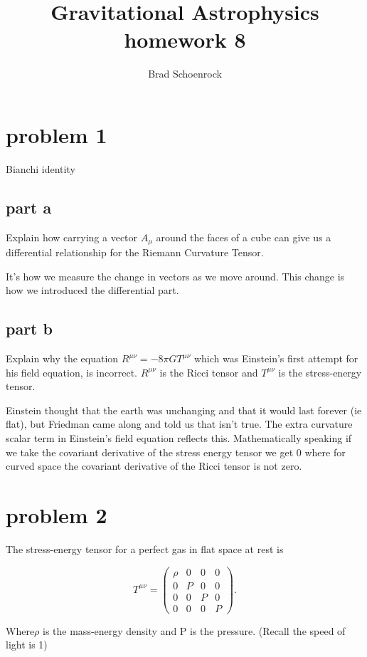 \documentclass{article}
\title{Gravitational Astrophysics homework 8}
\author{Brad Schoenrock}
\date{}
\begin{document}
\maketitle
\Large
\section{problem 1}
Bianchi identity
\subsection{part a}
Explain how carrying a vector $A_{\mu}$ around the faces of a cube can give us a differential relationship for the Riemann Curvature Tensor.

It’s how we measure the change in vectors as we move around. This change is how we introduced the differential part. 

\subsection{part b}
Explain why the equation $R^{\mu\nu}=-8\pi GT^{\mu\nu}$ which was Einstein's first attempt for his field equation, is incorrect. $R^{\mu\nu}$ is the Ricci tensor and $T^{\mu\nu}$ is the stress-energy tensor.

Einstein thought that the earth was unchanging and that it would last forever (ie flat), but Friedman came along and told us that isn't true. The extra curvature scalar term in Einstein’s field equation reflects this. Mathematically speaking if we take the covariant derivative of the stress energy tensor we get 0 where for curved space the covariant derivative of the Ricci tensor is not zero. 

\section{problem 2}

The stress-energy tensor for a perfect gas in flat space at rest is 

\[ T^{\mu\nu} = \left( \begin{array}{cccc}
\rho & 0 & 0 & 0 \\
0 & P & 0 & 0 \\
0 & 0 & P & 0 \\
0 & 0 & 0 & P \end{array} \right).\] 

Where$\rho$ is the mass-energy density and P is the pressure. (Recall the speed of light is 1)
\end{document}
